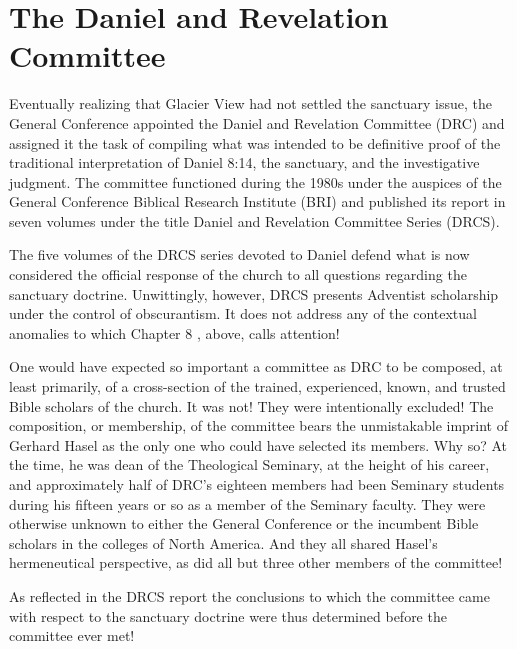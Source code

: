 \chapter{The Daniel and Revelation Committee}
\label{ch:committee}

Eventually realizing that Glacier View had not settled the sanctuary issue,
the General Conference appointed the Daniel and Revelation Committee (DRC)
and assigned it the task of compiling what was intended to be definitive 
proof of the traditional interpretation of Daniel 8:14, the sanctuary, and
the investigative judgment. The committee functioned during the 1980s under
the auspices of the General Conference Biblical Research Institute (BRI) and
published its report in seven volumes under the title Daniel and Revelation
Committee Series (DRCS).

The five volumes of the DRCS series devoted to Daniel defend what is now
considered the official response of the church to all questions regarding
the sanctuary doctrine. Unwittingly, however, DRCS presents Adventist
scholarship under the control of obscurantism. It does not address any of
the contextual anomalies to which Chapter 8 , above,
calls attention!

One would have expected so important a committee as DRC to be composed, at
least primarily, of a cross-section of the trained, experienced, known, and
trusted Bible scholars of the church. It was not! They were intentionally
excluded! The composition, or membership, of the committee bears the
unmistakable imprint of Gerhard Hasel as the only one who could have
selected its members. Why so? At the time, he was dean of the Theological
Seminary, at the height of his career, and approximately half of DRC's
eighteen members had been Seminary students during his fifteen years or so
as a member of the Seminary faculty. They were otherwise unknown to either
the General Conference or the incumbent Bible scholars in the colleges of
North America. And they all shared Hasel's hermeneutical perspective, as did
all but three other members of the committee!

As reflected in the DRCS report the conclusions to which the committee came
with respect to the sanctuary doctrine were thus determined before the
committee ever met!

